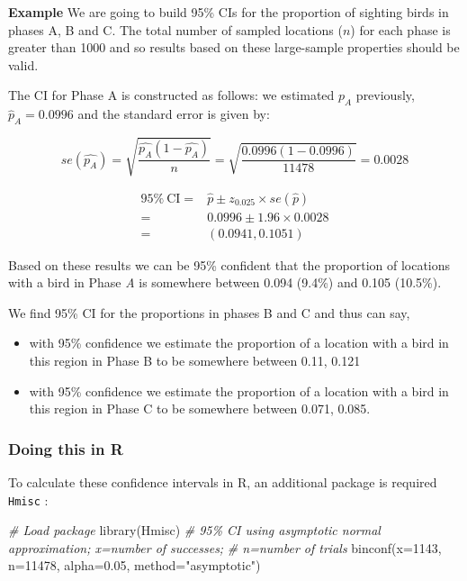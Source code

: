 \documentclass[
  oneside]{krantz}
\newenvironment{Shaded}{\begin{snugshade}}{\end{snugshade}}
\newcommand{\AttributeTok}[1]{\textcolor[rgb]{0.77,0.63,0.00}{#1}}
\newcommand{\CommentTok}[1]{\textcolor[rgb]{0.56,0.35,0.01}{\textit{#1}}}
\newcommand{\DecValTok}[1]{\textcolor[rgb]{0.00,0.00,0.81}{#1}}
\newcommand{\FloatTok}[1]{\textcolor[rgb]{0.00,0.00,0.81}{#1}}
\newcommand{\FunctionTok}[1]{\textcolor[rgb]{0.00,0.00,0.00}{#1}}
\newcommand{\NormalTok}[1]{#1}
\newcommand{\StringTok}[1]{\textcolor[rgb]{0.31,0.60,0.02}{#1}}
\begin{document}
\textbf{Example} We are going to build 95\% CIs for the proportion of sighting birds in phases A, B and C. The total number of sampled locations (\(n\)) for each phase is greater than 1000 and so results based on these large-sample properties should be valid.

The CI for Phase A is constructed as follows: we estimated \(p_A\) previously, \(\hat p_A = 0.0996\) and the standard error is given by:

\[se(\hat{p_A})=\sqrt{\frac{\hat{p_A}(1-\hat{p_A})}{n}}=
          \sqrt{\frac{0.0996(1-0.0996)}{11478}}=  0.0028\]

\begin{align*}
95\%~ \textrm{CI}=&\hat{p} \pm z_{0.025} \times se(\hat{p})\\
=&0.0996 \pm 1.96 \times 0.0028\\
=& (0.0941,0.1051)
\end{align*}

Based on these results we can be 95\% confident that the proportion of locations with a bird in Phase \emph{A} is somewhere between 0.094 (9.4\%) and 0.105 (10.5\%).

We find 95\% CI for the proportions in phases B and C and thus can say,

\begin{itemize}
\item
  with 95\% confidence we estimate the proportion of a location with a bird in this region in Phase B to be somewhere between 0.11, 0.121
\item
  with 95\% confidence we estimate the proportion of a location with a bird in this region in Phase C to be somewhere between 0.071, 0.085.
\end{itemize}

\hypertarget{doing-this-in-r-19}{%
\subsubsection{Doing this in R}\label{doing-this-in-r-19}}

To calculate these confidence intervals in R, an additional package is required \texttt{Hmisc} \citep{R-Hmisc}:

\begin{Shaded}
\begin{Highlighting}[]
\CommentTok{\# Load package}
\FunctionTok{library}\NormalTok{(Hmisc)}
\CommentTok{\# 95\% CI using asymptotic normal approximation; x=number of successes; }
\CommentTok{\#   n=number of trials}
\FunctionTok{binconf}\NormalTok{(}\AttributeTok{x=}\DecValTok{1143}\NormalTok{, }\AttributeTok{n=}\DecValTok{11478}\NormalTok{, }\AttributeTok{alpha=}\FloatTok{0.05}\NormalTok{, }\AttributeTok{method=}\StringTok{"asymptotic"}\NormalTok{)}
\end{Highlighting}
\end{Shaded}
\end{document}

